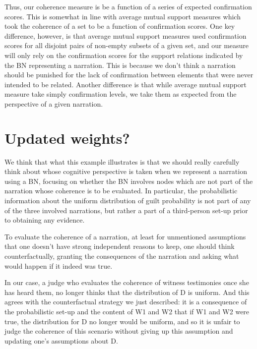 \documentclass[10pt,]{scrartcl}
\begin{document}
Thus, our coherence measure is be a function of a series of expected  confirmation scores. This is somewhat in line with average mutual
support measures which took the coherence of a set to be a function of
confirmation scores. One key difference, however, is that average mutual
support measures used confirmation scores for all disjoint pairs of
non-empty subsets of a given set, and our measure will only rely on the
confirmation scores for the support relations indicated by the BN
representing a narration. This is because we don't think a narration
should be punished for the lack of confirmation between elements that
were never intended to be related. Another difference is that while average mutual support measure take simply confirmation levels, we take them as expected from the perspective of a given narration.







\section{Updated weights?}



We think that what this example illustrates is that we should really
carefully think about whose cognitive perspective is taken when we
represent a narration using a BN, focusing on whether the BN involves
nodes which are not part of the narration whose coherence is to be
evaluated. In particular, the probabilistic information about the
uniform distribution of guilt probability is not part of any of the
three involved narrations, but rather a part of a third-person set-up
prior to obtaining any evidence.

To evaluate the coherence of a narration, at least for unmentioned
assumptions that one doesn't have strong independent reasons to keep,
one should think counterfactually, granting the consequences of the
narration and asking what would happen if it indeed was true. 



In our
case, a judge who evaluates the coherence of witness testimonies once
she has heard them, no longer thinks that the distribution of \textsf{D}
is uniform. And this agrees with the counterfactual strategy we just
described: it is a consequence of the probabilistic set-up and the
content of \textsf{W1} and \textsf{W2} that if \textsf{W1} and
\textsf{W2} were true, the distribution for \textsf{D} no longer would
be uniform, and so it is unfair to judge the coherence of this scenario
without giving up this assumption and updating one's assumptions about
\textsf{D}.
\end{document}
